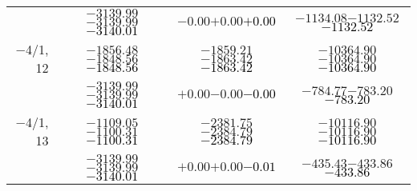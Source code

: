 \documentclass[compress]{beamer}
\begin{document}
\begin{frame}
{\begin{tabular}{r | c | c | c}
           & $-3139.99$\hspace{0.1 cm}$-3139.99$\hspace{0.1 cm}\textcolor{black}{$-3140.01$} & $-0.00$\hspace{0.1 cm}$+0.00$\hspace{0.1 cm}\textcolor{black}{$+0.00$} & $-1134.08$\hspace{0.1 cm}$-1132.52$\hspace{0.1 cm}\textcolor{black}{$-1132.52$} \\
$-$4/1, 12 & $-1856.48$\hspace{0.1 cm}$-1848.56$\hspace{0.1 cm}\textcolor{black}{$-1848.56$} & $-1859.21$\hspace{0.1 cm}$-1863.42$\hspace{0.1 cm}\textcolor{black}{$-1863.42$} & $-10364.90$\hspace{0.1 cm}$-10364.90$\hspace{0.1 cm}\textcolor{black}{$-10364.90$} \\
           & $-3139.99$\hspace{0.1 cm}$-3139.99$\hspace{0.1 cm}\textcolor{black}{$-3140.01$} & $+0.00$\hspace{0.1 cm}$-0.00$\hspace{0.1 cm}\textcolor{black}{$-0.00$} & $-784.77$\hspace{0.1 cm}$-783.20$\hspace{0.1 cm}\textcolor{black}{$-783.20$} \\
$-$4/1, 13 & $-1109.05$\hspace{0.1 cm}$-1100.31$\hspace{0.1 cm}\textcolor{black}{$-1100.31$} & $-2381.75$\hspace{0.1 cm}$-2384.79$\hspace{0.1 cm}\textcolor{black}{$-2384.79$} & $-10116.90$\hspace{0.1 cm}$-10116.90$\hspace{0.1 cm}\textcolor{black}{$-10116.90$} \\
           & $-3139.99$\hspace{0.1 cm}$-3139.99$\hspace{0.1 cm}\textcolor{black}{$-3140.01$} & $+0.00$\hspace{0.1 cm}$+0.00$\hspace{0.1 cm}\textcolor{black}{$-0.01$} & $-435.43$\hspace{0.1 cm}$-433.86$\hspace{0.1 cm}\textcolor{black}{$-433.86$} \\

\end{tabular}}
\end{frame}
\end{document}
